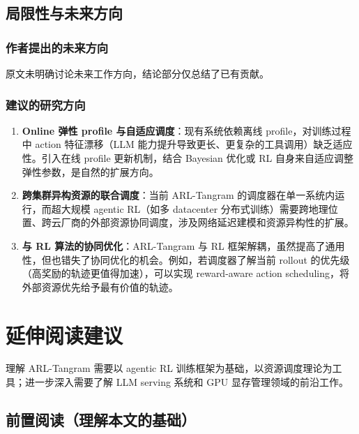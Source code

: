 \documentclass[11pt, a4paper]{article}
\begin{document}
\subsection{局限性与未来方向}

\subsubsection{作者提出的未来方向}
原文未明确讨论未来工作方向，结论部分仅总结了已有贡献。

\subsubsection{建议的研究方向}

\begin{enumerate}
  \item \textbf{Online 弹性 profile 与自适应调度}：现有系统依赖离线 profile，对训练过程中 action 特征漂移（LLM 能力提升导致更长、更复杂的工具调用）缺乏适应性。引入在线 profile 更新机制，结合 Bayesian 优化或 RL 自身来自适应调整弹性参数，是自然的扩展方向。

  \item \textbf{跨集群异构资源的联合调度}：当前 ARL-Tangram 的调度器在单一系统内运行，而超大规模 agentic RL（如多 datacenter 分布式训练）需要跨地理位置、跨云厂商的外部资源协同调度，涉及网络延迟建模和资源异构性的扩展。

  \item \textbf{与 RL 算法的协同优化}：ARL-Tangram 与 RL 框架解耦，虽然提高了通用性，但也错失了协同优化的机会。例如，若调度器了解当前 rollout 的优先级（高奖励的轨迹更值得加速），可以实现 reward-aware action scheduling，将外部资源优先给予最有价值的轨迹。
\end{enumerate}

\section{延伸阅读建议}

\begin{keyinsight}[TL;DR]
理解 ARL-Tangram 需要以 agentic RL 训练框架为基础，以资源调度理论为工具；进一步深入需要了解 LLM serving 系统和 GPU 显存管理领域的前沿工作。
\end{keyinsight}

\subsection{前置阅读（理解本文的基础）}
\end{document}
